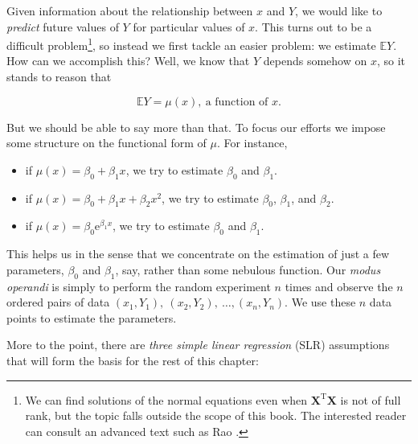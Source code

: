 \documentclass[]{book}
\providecommand{\tightlist}{%
  \setlength{\itemsep}{0pt}\setlength{\parskip}{0pt}}
\let\rmarkdownfootnote\footnote%
\def\footnote{\protect\rmarkdownfootnote}
\numberwithin{equation}{chapter}
\numberwithin{figure}{chapter}
\theoremstyle{plain}
\theoremstyle{definition}
\theoremstyle{remark}
\theoremstyle{definition}
\theoremstyle{definition}
\theoremstyle{remark}
\begin{document}
Given information about the relationship between \(x\) and \(Y\), we
would like to \emph{predict} future values of \(Y\) for particular
values of \(x\). This turns out to be a difficult problem\footnote{We
  can find solutions of the normal equations even when
  \(\mathbf{X}^{\mathrm{T}}\mathbf{X}\) is not of full rank, but the
  topic falls outside the scope of this book. The interested reader can
  consult an advanced text such as Rao \autocite{Rao1999}.}, so instead
we first tackle an easier problem: we estimate \(\mathbb{E}Y\). How can
we accomplish this? Well, we know that \(Y\) depends somehow on \(x\),
so it stands to reason that

\begin{equation}
\mathbb{E} Y = \mu(x),\ \mbox{a function of }x.
\end{equation}

But we should be able to say more than that. To focus our efforts we
impose some structure on the functional form of \(\mu\). For instance,

\begin{itemize}
\tightlist
\item
  if \(\mu(x)=\beta_{0}+\beta_{1}x\), we try to estimate \(\beta_{0}\)
  and \(\beta_{1}\).
\item
  if \(\mu(x) = \beta_{0} + \beta_{1}x + \beta_{2}x^{2}\), we try to
  estimate \(\beta_{0}\), \(\beta_{1}\), and \(\beta_{2}\).
\item
  if \(\mu(x) = \beta_{0} \mathrm{e}^{\beta_{1}x}\), we try to estimate
  \(\beta_{0}\) and \(\beta_{1}\).
\end{itemize}

This helps us in the sense that we concentrate on the estimation of just
a few parameters, \(\beta_{0}\) and \(\beta_{1}\), say, rather than some
nebulous function. Our \emph{modus operandi} is simply to perform the
random experiment \(n\) times and observe the \(n\) ordered pairs of
data \((x_{1},Y_{1}),\ (x_{2},Y_{2}),\ \ldots,(x_{n},Y_{n})\). We use
these \(n\) data points to estimate the parameters.

More to the point, there are \emph{three simple linear regression} (SLR)
assumptions  that will form the basis for
the rest of this chapter:

\bigskip
\end{document}
